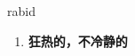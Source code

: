 
\begin{frame}
{\huge rabid}
\begin{center}
\begin{enumerate}\Large
  \item \textbf{狂热的，不冷静的}
\end{enumerate}
\end{center}
\end{frame}

